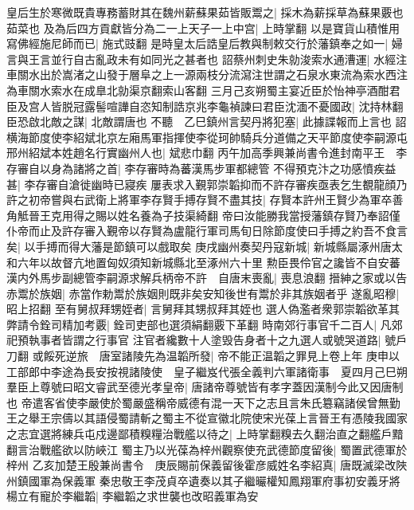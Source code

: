 皇后生於寒微既貴專務蓄財其在魏州薪蘇果茹皆販鬻之|{
	採木為薪採草為蘇果覈也茹菜也}
及為后四方貢獻皆分為二一上天子一上中宫|{
	上時掌翻}
以是寶貨山積惟用寫佛經施尼師而已|{
	施式豉翻}
是時皇太后誥皇后教與制敕交行於藩鎮奉之如一|{
	婦言與王言並行自古亂政未有如同光之甚者也}
詔蔡州刺史朱勍浚索水通漕運|{
	水經注車關水出於嵩渚之山發于層阜之上一源兩枝分流瀉注世謂之石泉水東流為索水西注為車關水索水在成臯北勍渠京翻索山客翻}
三月己亥朔蜀主宴近臣於怡神亭酒酣君臣及宫人皆脱冠露髻喧譁自恣知制誥京兆李龜禎諫曰君臣沈湎不憂國政|{
	沈持林翻}
臣恐啟北敵之謀|{
	北敵謂唐也}
不聽　乙巳鎮州言契丹將犯塞|{
	此據諜報而上言也}
詔横海節度使李紹斌北京左廂馬軍指揮使李從珂帥騎兵分道備之天平節度使李嗣源屯邢州紹斌本姓趙名行實幽州人也|{
	斌悲巾翻}
丙午加高季興兼尚書令進封南平王　李存審自以身為諸將之首|{
	李存審時為蕃漢馬步軍都總管}
不得預克汴之功感憤疾益甚|{
	李存審自滄徙幽時已寢疾}
屢表求入覲郭崇韜抑而不許存審疾亟表乞生覩龍顔乃許之初帝嘗與右武衛上將軍李存賢手搏存賢不盡其技|{
	存賢本許州王賢少為軍卒善角觝晉王克用得之賜以姓名養為子技渠綺翻}
帝曰汝能勝我當授藩鎮存賢乃奉詔僅仆帝而止及許存審入覲帝以存賢為盧龍行軍司馬旬日除節度使曰手搏之約吾不食言矣|{
	以手搏而得大藩是節鎮可以戲取矣}
庚戌幽州奏契丹寇新城|{
	新城縣屬涿州唐太和六年以故督亢地置匈奴須知新城縣北至涿州六十里}
勲臣畏伶官之讒皆不自安蕃漢内外馬步副總管李嗣源求解兵柄帝不許　自唐末喪亂|{
	喪息浪翻}
搢紳之家或以告赤鬻於族姻|{
	赤當作勅鬻於族姻則既非矣安知後世有鬻於非其族姻者乎}
遂亂昭穆|{
	昭上招翻}
至有舅叔拜甥姪者|{
	言舅拜其甥叔拜其姪也}
選人偽濫者衆郭崇韜欲革其弊請令銓司精加考覈|{
	銓司吏部也選須絹翻覈下革翻}
時南郊行事官千二百人|{
	凡郊祀預執事者皆謂之行事官}
注官者纔數十人塗毁告身者十之九選人或號哭道路|{
	號戶刀翻}
或餒死逆旅　唐室諸陵先為温韜所發|{
	帝不能正温韜之罪見上卷上年}
庚申以工部郎中李途為長安按視諸陵使　皇子繼岌代張全義判六軍諸衛事　夏四月己巳朔羣臣上尊號曰昭文睿武至德光孝皇帝|{
	唐諸帝尊號皆有孝字蓋因漢制今此又因唐制也}
帝遣客省使李嚴使於蜀嚴盛稱帝威德有混一天下之志且言朱氏簒竊諸侯曾無勤王之舉王宗儔以其語侵蜀請斬之蜀主不從宣徽北院使宋光葆上言晉王有憑陵我國家之志宜選將練兵屯戍邊鄙積糗糧治戰艦以待之|{
	上時掌翻糗去久翻治直之翻艦戶黯翻言治戰艦欲以防峽江}
蜀主乃以光葆為梓州觀察使充武德節度留後|{
	蜀置武德軍於梓州}
乙亥加楚王殷兼尚書令　庚辰賜前保義留後霍彦威姓名李紹真|{
	唐既滅梁改陜州鎮國軍為保義軍}
秦忠敬王李茂貞卒遺奏以其子繼曮權知鳳翔軍府事初安義牙將楊立有寵於李繼韜|{
	李繼韜之求世襲也改昭義軍為安}


